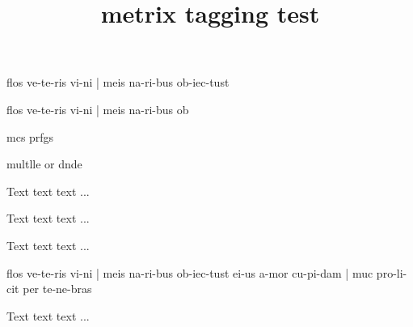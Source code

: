 \documentclass{article}
\title{metrix tagging test}
\begin{document}

{flos ve-te-ris vi-ni | meis na-ri-bus ob-iec-tust}

{flos ve-te-ris vi-ni | meis na-ri-bus ob}

mcs prfgs

multlle or dnde

Text text text ...
\begin{symbolline}
\end{symbolline}
Text text text ...

Text text text ...
\begin{metricverses}
{flos ve-te-ris vi-ni | meis na-ri-bus ob-iec-tust}
{ei-us a-mor cu-pi-dam | {muc} pro-li-cit
per te-ne-bras}
\end{metricverses}
Text text text ...
\end{document}
